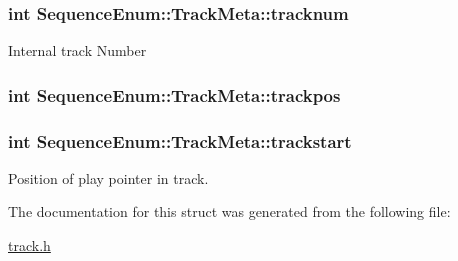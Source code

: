 \hypertarget{structSequenceEnum_1_1TrackMeta_a81dd2145cc5abc9e60f5bd6cb695a716}{
\subsubsection[{tracknum}]{\setlength{\rightskip}{0pt plus 5cm}int Sequence\-Enum\-::\-Track\-Meta\-::tracknum}}\label{structSequenceEnum_1_1TrackMeta_a81dd2145cc5abc9e60f5bd6cb695a716}
Internal track Number \hypertarget{structSequenceEnum_1_1TrackMeta_a63c0a0b23a0ce779fc9be922e4ad27ad}{
\subsubsection[{trackpos}]{\setlength{\rightskip}{0pt plus 5cm}int Sequence\-Enum\-::\-Track\-Meta\-::trackpos}}\label{structSequenceEnum_1_1TrackMeta_a63c0a0b23a0ce779fc9be922e4ad27ad}
\hypertarget{structSequenceEnum_1_1TrackMeta_aa28b22719f6f8276364082d9e9479ce5}{
\subsubsection[{trackstart}]{\setlength{\rightskip}{0pt plus 5cm}int Sequence\-Enum\-::\-Track\-Meta\-::trackstart}}\label{structSequenceEnum_1_1TrackMeta_aa28b22719f6f8276364082d9e9479ce5}


Position of play pointer in track. 



The documentation for this struct was generated from the following file\-:\begin{DoxyCompactItemize}
\item 
\hyperlink{track_8h}{track.\-h}\end{DoxyCompactItemize}
